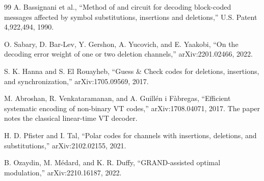 \documentclass[11pt]{article}
\theoremstyle{definition}
\theoremstyle{remark}
\begin{document}
\begin{thebibliography}{99}
A. Bassignani et al., ``Method of and circuit for decoding block-coded messages affected by symbol substitutions, insertions and deletions,'' U.S. Patent 4,922,494, 1990.

O. Sabary, D. Bar-Lev, Y. Gershon, A. Yucovich, and E. Yaakobi, ``On the decoding error weight of one or two deletion channels,'' arXiv:2201.02466, 2022.

S. K. Hanna and S. El Rouayheb, ``Guess \& Check codes for deletions, insertions, and synchronization,'' arXiv:1705.09569, 2017.

M. Abroshan, R. Venkataramanan, and A. Guill\'en i F\`abregas, ``Efficient systematic encoding of non-binary VT codes,'' arXiv:1708.04071, 2017.  The paper notes the classical linear-time VT decoder.

H. D. Pfister and I. Tal, ``Polar codes for channels with insertions, deletions, and substitutions,'' arXiv:2102.02155, 2021.

B. Ozaydin, M. M\'edard, and K. R. Duffy, ``GRAND-assisted optimal modulation,'' arXiv:2210.16187, 2022.
\end{thebibliography}
\end{document}

